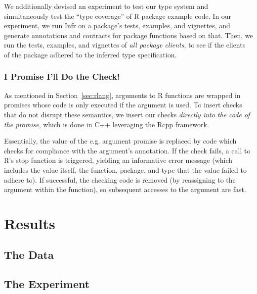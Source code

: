 \documentclass[sigplan,10pt,review,anonymous]{acmart}\settopmatter{printfolios=true,printccs=false,printacmref=false}
\begin{document}
We additionally devised an experiment to test our type system and simultaneously test the ``type coverage'' of R package example code.
In our experiment, we run Infr on a package's tests, examples, and vignettes, and generate annotations and contracts for package functions based on that.
Then, we run the tests, examples, and vignettes of {\it all package clients}, to see if the clients of the package adhered to the inferred type specification.

%
%
\subsubsection{I Promise I'll Do the Check!}
\label{subsubsec:promise}

As mentioned in Section~\ref{sec:rlang}, arguments to R functions are wrapped in promises whose code is only executed if the argument is used.
To insert checks that do not disrupt these semantics, we insert our checks {\it directly into the code of the promise}, which is done in C++ leveraging the Rcpp framework.

Essentially, the value of the e.g. argument promise is replaced by code which checks for compliance with the argument's annotation.
If the check fails, a call to R's stop function is triggered, yielding an informative error message (which includes the value itself, the function, package, and type that the value failed to adhere to).
If successful, the checking code is removed (by reassigning to the argument within the function), so subsequent accesses to the argument are fast.

%
%
%
%
%
%
\section{Results}
\label{sec:results}


%
%
%
%
\subsection{The Data}
\label{sec:results_data}


%
%
%
%
\subsection{The Experiment}
\label{sec:results_experiment}
\end{document}
